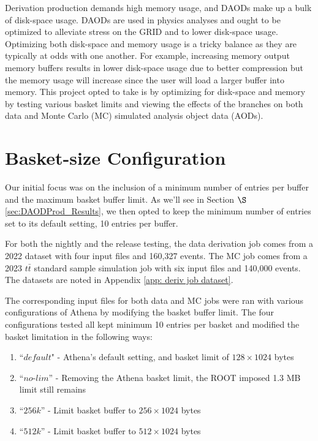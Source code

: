 Derivation production demands high memory usage, and DAODs make up a bulk of disk-space usage. 
DAODs are used in physics analyses and ought to be optimized to alleviate stress on the GRID and to lower disk-space usage. 
Optimizing both disk-space and memory usage is a tricky balance as they are typically at odds with one another. 
For example, increasing memory output memory buffers results in lower disk-space usage due to better compression but the memory usage will increase since the user will load a larger buffer into memory. 
This project opted to take is by optimizing for disk-space and memory by testing various basket limits and viewing the effects of the branches on both data and Monte Carlo (MC) simulated analysis object data (AODs).

\section{Basket-size Configuration}
\label{sec:DAODProd_Analysis}

Our initial focus was on the inclusion of a minimum number of entries per buffer and the maximum basket buffer limit.
As we'll see in Section $\S$\ref{sec:DAODProd_Results}, we then opted to keep the minimum number of entries set to its default setting, 10 entries per buffer. 


For both the nightly and the release testing, the data derivation job comes from a 2022 dataset with four input files and 160,327 events. 
The MC job comes from a 2023 $t\bar{t}$ standard sample simulation job with six input files and 140,000 events. 
The datasets are noted in Appendix \ref{app: deriv job dataset}.

The corresponding input files for both data and MC jobs were ran with various configurations of Athena by modifying the basket buffer limit. 
The four configurations tested all kept minimum 10 entries per basket and modified the basket limitation in the following ways: 

\begin{enumerate}
    \item ``$\textit{default}$" - Athena's default setting, and basket limit of $128\times1024$ bytes
    \item ``$\textit{no-lim}$'' - Removing the Athena basket limit, the ROOT imposed 1.3 MB limit still remains
    \item ``$\textit{256k}$'' - Limit basket buffer to $256\times1024$ bytes
    \item ``$\textit{512k}$'' - Limit basket buffer to $512\times1024$ bytes
\end{enumerate}

